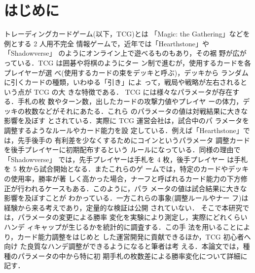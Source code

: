 \documentclass[twocolumn]{ltjsarticle}
\begin{document}
\section{はじめに}
\small{
  トレーディングカードゲーム(以下，TCG)とは
「Magic: the Gathering」などを例とする 2 人用不完全
情報ゲームで，近年では「Hearthstone」や「Shadowverse」
のようにオンライン上で遊べるものもあり，その裾
野が広がっている．TCG は囲碁や将棋のようにター
ン制で進むが，使用するカードを各プレイヤーが選
べ(使用するカードの束をデッキと呼ぶ)，デッキから
ランダムに引くカードの種類，いわゆる「引き」によ
って，戦局や戦略が左右されるという点が TCG の大
きな特徴である．
TCG には様々なパラメータが存在する．手札の枚
数やターン数，出したカードの攻撃力値やプレイヤ
ーの体力，デッキの枚数などがそれにあたる．これら
のパラメータの値は対戦結果に大きな影響を及ぼす
とされている．実際に TCG 運営会社は，試合中のパ
ラメータを調整するようなルールやカード能力を設
定している．例えば「Hearthstone」では，先手後手の
有利差を少なくするためにコインというパラメータ
調整カードを後手プレイヤーに初期配布するという
ルールになっている．同様の理由で「Shadowverse」
では，先手プレイヤーは手札を 4 枚，後手プレイヤー
は手札を 5 枚から試合開始となる．またこれらのゲ
ームでは，特定のカードやデッキの使用率，勝率が著
しく高かった場合，ナーフと呼ばれるカード能力の下方修正が行われるケースもある．このように，パラ
メータの値は試合結果に大きな影響を及ぼすことが
わかっている．一方これらの事象(調整ルールやナー
フ)は経験から来る考えであり，定量的な検証は公開
されていない．
そこで本研究では，パラメータの変更による勝率
変化を実験により測定し，実際にどれくらいハンデ
ィキャップが生じるかを統計的に調査する．この手
法を用いることにより，カード能力調整をはじめと
した運営開発に貢献できるほか，TCG 初心者へ向け
た良質なハンデ調整ができるようになると筆者は考
える．本論文では，種種のパラメータの中から特に初
期手札の枚数差による勝率変化について詳細に記す．

}



\end{document}
